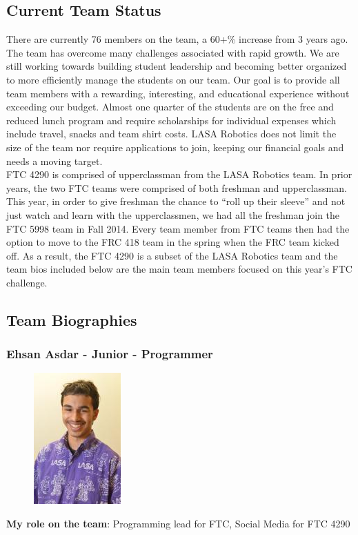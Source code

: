 \clearpage
\newpage

\subsection{Current Team Status}
There are currently 76 members on the team, a 60+\% increase from 3 years ago. The team has overcome many challenges associated with rapid growth.  We are still working towards building student leadership and becoming better organized to more efficiently manage the students on our team.  Our goal is to provide all team members with a rewarding, interesting, and educational experience without exceeding our budget. Almost one quarter of the students are on the free and reduced lunch program and require scholarships for individual expenses which include travel, snacks and team shirt costs. LASA Robotics does not limit the size of the team nor require applications to join, keeping our financial goals and needs a moving target.\\

FTC 4290 is comprised of upperclassman from the LASA Robotics team.  In prior years, the two FTC teams were comprised of both freshman and upperclassman.  This year, in order to give freshman the chance to “roll up their sleeve” and not just watch and learn with the upperclassmen, we had all the freshman join the FTC 5998 team in Fall 2014.  Every team member from FTC teams then had the option to move to the FRC 418 team in the spring when the FRC team kicked off.  As a result, the FTC 4290 is a subset of the LASA Robotics team and the team bios included below are the main team members focused on this year’s FTC challenge.\\

\clearpage
\newpage

\subsection{Team Biographies}
\subsubsection{Ehsan Asdar - Junior - Programmer} 
\begin{figure}[H]
	\includegraphics[width=0.2\linewidth]{ehsan}
\end{figure}
{\bf My role on the team}: Programming lead for FTC, Social Media for FTC 4290

